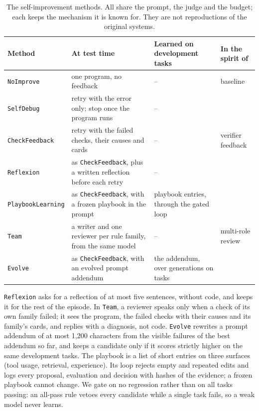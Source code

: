 \begin{table}[!htb]
\centering
\small
\setlength{\tabcolsep}{4pt}
\begin{tabular}{@{}lp{5.3cm}p{3.9cm}p{2.8cm}@{}}
\toprule
Method & At test time & Learned on development tasks & In the spirit of \\
\midrule
\texttt{NoImprove} & one program, no feedback & -- & baseline \\
\texttt{SelfDebug} & retry with the error only; stop once the program runs & -- &
\citet{chen2024selfdebug} \\
\texttt{CheckFeedback} & retry with the failed checks, their causes and cards & -- &
verifier feedback \\
\texttt{Reflexion} & as \texttt{CheckFeedback}, plus a written reflection before each retry &
-- & \citet{shinn2023reflexion} \\
\texttt{PlaybookLearning} & as \texttt{CheckFeedback}, with a frozen playbook in the prompt &
playbook entries, through the gated loop & \citet{zhao2024expel,suzgun2026dynamic} \\
\texttt{Team} & a writer and one reviewer per rule family, from the same model & -- &
multi-role review \\
\texttt{Evolve} & as \texttt{CheckFeedback}, with an evolved prompt addendum & the addendum,
over \EvolveGenerations{} generations on \EvolveMinibatch{} tasks & \citet{agrawal2026gepa} \\
\bottomrule
\end{tabular}
\caption{The \NMethods{} self-improvement methods. All share the prompt, the judge and the
budget; each keeps the mechanism it is known for. They are not reproductions of the original
systems.}
\label{tab:methods}
\end{table}

\texttt{Reflexion} asks for a reflection of at most five sentences, without code, and keeps it
for the rest of the episode. In \texttt{Team}, a reviewer speaks only when a check of its own
family failed; it sees the program, the failed checks with their causes and its family's cards,
and replies with a diagnosis, not code. \texttt{Evolve} rewrites a prompt addendum of at most
1,200 characters from the visible failures of the best addendum so far, and keeps a candidate
only if it scores strictly higher on the same development tasks. The playbook is a list of short
entries on three surfaces (tool usage, retrieval, experience). Its loop rejects empty and
repeated edits and logs every proposal, evaluation and decision with hashes of the evidence; a
frozen playbook cannot change. We gate on no regression rather than on all tasks passing: an
all-pass rule vetoes every candidate while a single task fails, so a weak model never learns.

